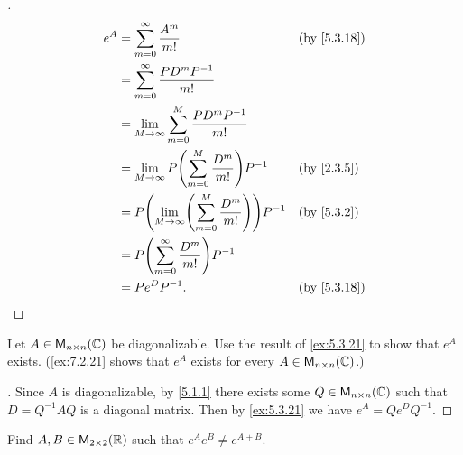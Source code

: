 \begin{proof}[]
  \begin{align*}
    e^A & = \sum_{m = 0}^\infty \frac{A^m}{m!}                                   &  & \text{(by \cref{5.3.18})} \\
        & = \sum_{m = 0}^\infty \frac{P D^m P^{-1}}{m!}                                                         \\
        & = \lim_{M \to \infty} \sum_{m = 0}^M \frac{P D^m P^{-1}}{m!}                                          \\
        & = \lim_{M \to \infty} P \pa{\sum_{m = 0}^M \frac{D^m}{m!}} P^{-1}      &  & \text{(by \cref{2.3.5})}  \\
        & = P \pa{\lim_{M \to \infty} \pa{\sum_{m = 0}^M \frac{D^m}{m!}}} P^{-1} &  & \text{(by \cref{5.3.2})}  \\
        & = P \pa{\sum_{m = 0}^\infty \frac{D^m}{m!}} P^{-1}                                                    \\
        & = P e^D P^{-1}.                                                        &  & \text{(by \cref{5.3.18})}
  \end{align*}
\end{proof}

\begin{ex}\label{ex:5.3.22}
  Let \(A \in \mathsf{M}_{{n} \times n}({\mathbb{C}})\) be diagonalizable.
  Use the result of \cref{ex:5.3.21} to show that \(e^A\) exists.
  (\cref{ex:7.2.21} shows that \(e^A\) exists for every \(A \in \mathsf{M}_{{n} \times n}({\mathbb{C}})\).)
\end{ex}

\begin{proof}[]
  Since \(A\) is diagonalizable, by \cref{5.1.1} there exists some \(Q \in \mathsf{M}_{{n} \times n}({\mathbb{C}})\) such that \(D = Q^{-1} A Q\) is a diagonal matrix.
  Then by \cref{ex:5.3.21} we have \(e^A = Q e^D Q^{-1}\).
\end{proof}

\begin{ex}\label{ex:5.3.23}
  Find \(A, B \in \mathsf{M}_{{2} \times 2}({\mathbb{R}})\) such that \(e^A e^B \neq e^{A + B}\).
\end{ex}


